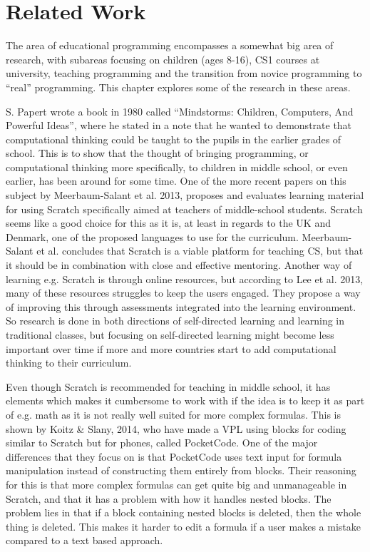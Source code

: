 \chapter{Related Work}
\label{chap:related_work}
The area of educational programming encompasses a somewhat big area of research, with subareas focusing on children (ages 8-16), CS1 courses at university, teaching programming and the transition from novice programming to ``real'' programming. This chapter explores some of the research in these areas.

S. Papert wrote a book in 1980 called ``Mindstorms: Children, Computers, And Powerful Ideas''\cite{1}, where he stated in a note that he wanted to demonstrate that computational thinking could be taught to the pupils in the earlier grades of school\cite{11}. This is to show that the thought of bringing programming, or computational thinking more specifically, to children in middle school, or even earlier, has been around for some time. One of the more recent papers on this subject by Meerbaum-Salant et al. 2013\cite{3}, proposes and evaluates learning material for using Scratch specifically aimed at teachers of middle-school students. Scratch seems like a good choice for this as it is, at least in regards to the UK and Denmark, one of the proposed languages to use for the curriculum\cite{4}\cite{5}. Meerbaum-Salant et al. concludes that Scratch is a viable platform for teaching CS, but that it should be in combination with close and effective mentoring. Another way of learning e.g. Scratch is through online resources, but according to Lee et al. 2013\cite{6}, many of these resources struggles to keep the users engaged. They propose a way of improving this through assessments integrated into the learning environment. So research is done in both directions of self-directed learning and learning in traditional classes, but focusing on self-directed learning might become less important over time if more and more countries start to add computational thinking to their curriculum.

Even though Scratch is recommended for teaching in middle school, it has elements which makes it cumbersome to work with if the idea is to keep it as part of e.g. math\cite{5} as it is not really well suited for more complex formulas. This is shown by Koitz \& Slany, 2014\cite{7}, who have made a VPL using blocks for coding similar to Scratch but for phones, called PocketCode. One of the major differences that they focus on is that PocketCode uses text input for formula manipulation instead of constructing them entirely from blocks. Their reasoning for this is that more complex formulas can get quite big and unmanageable in Scratch, and that it has a problem with how it handles nested blocks. The problem lies in that if a block containing nested blocks is deleted, then the whole thing is deleted. This makes it harder to edit a formula if a user makes a mistake compared to a text based approach.

